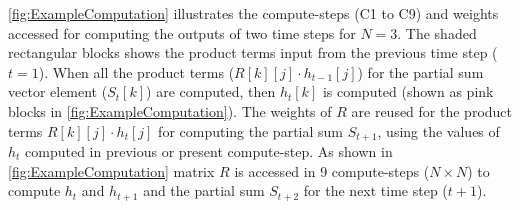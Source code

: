 \figurename{\ref{fig:ExampleComputation}} illustrates the compute-steps (C1 to C9) and weights accessed for computing the outputs of two time steps for $N{=}3$. The shaded rectangular blocks shows the product terms input from the previous time step ($t{=}1$). When all the product terms ($R[k][j]{\cdot}h_{t-1}[j]$) for the partial sum vector  element ($S_t[k]$) are computed, then $h_t[k]$ is computed (shown as pink blocks in \figurename{\ref{fig:ExampleComputation}}). The weights of $R$ are reused for the product terms $R[k][j]{\cdot}h_{t}[j]$ for computing the partial sum $S_{t+1}$, using the values of $h_t$ computed in previous or present compute-step. As shown in \figurename{\ref{fig:ExampleComputation}} matrix $R$ is accessed in 9 compute-steps ($N{\times}N$) to compute $h_t$ and $h_{t+1}$ and the partial sum $S_{t+2}$ for the next time step ($t{+}1$).
